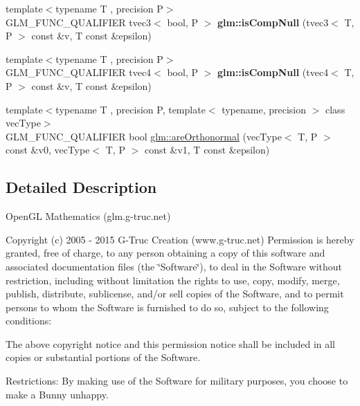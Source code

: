 \begin{DoxyCompactItemize}
\item 
\hypertarget{namespaceglm_a5972ae9ce1c88fcd539f51a218af865f}{{\footnotesize template$<$typename T , precision P$>$ }\\G\-L\-M\-\_\-\-F\-U\-N\-C\-\_\-\-Q\-U\-A\-L\-I\-F\-I\-E\-R tvec3$<$ bool, P $>$ {\bfseries glm\-::is\-Comp\-Null} (tvec3$<$ T, P $>$ const \&v, T const \&epsilon)}\label{namespaceglm_a5972ae9ce1c88fcd539f51a218af865f}

\item 
\hypertarget{namespaceglm_ac4b73e500deea02815aa386fe10296c8}{{\footnotesize template$<$typename T , precision P$>$ }\\G\-L\-M\-\_\-\-F\-U\-N\-C\-\_\-\-Q\-U\-A\-L\-I\-F\-I\-E\-R tvec4$<$ bool, P $>$ {\bfseries glm\-::is\-Comp\-Null} (tvec4$<$ T, P $>$ const \&v, T const \&epsilon)}\label{namespaceglm_ac4b73e500deea02815aa386fe10296c8}

\item 
{\footnotesize template$<$typename T , precision P, template$<$ typename, precision $>$ class vec\-Type$>$ }\\G\-L\-M\-\_\-\-F\-U\-N\-C\-\_\-\-Q\-U\-A\-L\-I\-F\-I\-E\-R bool \hyperlink{group__gtx__vector__query_ga89c82bc60e5b84e4489b74c15a134caf}{glm\-::are\-Orthonormal} (vec\-Type$<$ T, P $>$ const \&v0, vec\-Type$<$ T, P $>$ const \&v1, T const \&epsilon)
\end{DoxyCompactItemize}


\subsection{Detailed Description}
Open\-G\-L Mathematics (glm.\-g-\/truc.\-net)

Copyright (c) 2005 -\/ 2015 G-\/\-Truc Creation (www.\-g-\/truc.\-net) Permission is hereby granted, free of charge, to any person obtaining a copy of this software and associated documentation files (the \char`\"{}\-Software\char`\"{}), to deal in the Software without restriction, including without limitation the rights to use, copy, modify, merge, publish, distribute, sublicense, and/or sell copies of the Software, and to permit persons to whom the Software is furnished to do so, subject to the following conditions\-:

The above copyright notice and this permission notice shall be included in all copies or substantial portions of the Software.

Restrictions\-: By making use of the Software for military purposes, you choose to make a Bunny unhappy.

